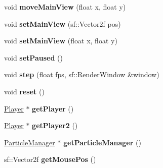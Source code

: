 \begin{DoxyCompactItemize}
\item 
\hypertarget{class_level_controller_a02c383a82a966cb4c0a53d571e771016}{void {\bfseries move\+Main\+View} (float x, float y)}\label{class_level_controller_a02c383a82a966cb4c0a53d571e771016}

\item 
\hypertarget{class_level_controller_a18cdb3e6d6f3d6e9dde4de2c21bc99cf}{void {\bfseries set\+Main\+View} (sf\+::\+Vector2f pos)}\label{class_level_controller_a18cdb3e6d6f3d6e9dde4de2c21bc99cf}

\item 
\hypertarget{class_level_controller_a60cba41df915fcfa0fbb4bff105923e0}{void {\bfseries set\+Main\+View} (float x, float y)}\label{class_level_controller_a60cba41df915fcfa0fbb4bff105923e0}

\item 
\hypertarget{class_level_controller_a57e12d591397a1ab9c2641abf2b5fa9d}{void {\bfseries set\+Paused} ()}\label{class_level_controller_a57e12d591397a1ab9c2641abf2b5fa9d}

\item 
\hypertarget{class_level_controller_acc3a82f2de457b3cb3863c5bb49a909c}{void {\bfseries step} (float fps, sf\+::\+Render\+Window \&window)}\label{class_level_controller_acc3a82f2de457b3cb3863c5bb49a909c}

\item 
\hypertarget{class_level_controller_a5d7b9ef50353a7d1e357632180ce75e5}{void {\bfseries reset} ()}\label{class_level_controller_a5d7b9ef50353a7d1e357632180ce75e5}

\item 
\hypertarget{class_level_controller_a203ded80ef03720a9e9069d54e500689}{\hyperlink{class_player}{Player} $\ast$ {\bfseries get\+Player} ()}\label{class_level_controller_a203ded80ef03720a9e9069d54e500689}

\item 
\hypertarget{class_level_controller_a327a14ec720c334f0f6c92ae3ad33924}{\hyperlink{class_player}{Player} $\ast$ {\bfseries get\+Player2} ()}\label{class_level_controller_a327a14ec720c334f0f6c92ae3ad33924}

\item 
\hypertarget{class_level_controller_a8e3f9f2081f00f3e1ade44eb7e8c24ad}{\hyperlink{class_particle_manager}{Particle\+Manager} $\ast$ {\bfseries get\+Particle\+Manager} ()}\label{class_level_controller_a8e3f9f2081f00f3e1ade44eb7e8c24ad}

\item 
\hypertarget{class_level_controller_ac08e5cb1592d8e7378253732e9989801}{sf\+::\+Vector2f {\bfseries get\+Mouse\+Pos} ()}\label{class_level_controller_ac08e5cb1592d8e7378253732e9989801}


\end{DoxyCompactItemize}
